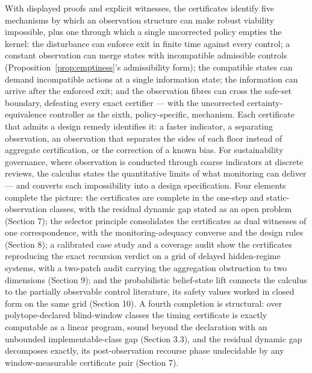 \documentclass[10pt,twocolumn]{article}
\theoremstyle{definition}
\begin{document}
With displayed proofs and explicit witnesses, the certificates identify
five mechanisms by which an observation structure can make robust
viability impossible, plus one through which a single uncorrected policy
empties the kernel: the disturbance can enforce exit in finite time
against every control; a constant observation can merge states with
incompatible admissible controls (Proposition~\ref{prop:emptiness}'s admissibility form);
the compatible states can demand incompatible actions at a single
information state; the information can arrive after the enforced exit;
and the observation fibres can cross the safe-set boundary, defeating
every exact certifier --- with the uncorrected certainty-equivalence controller as the
sixth, policy-specific, mechanism. Each certificate that admits a design
remedy identifies it: a faster indicator, a separating observation, an
observation that separates the sides of each floor instead of aggregate
certification, or the correction of a known bias. For sustainability
governance, where observation is conducted through coarse indicators at
discrete reviews, the calculus states the quantitative limits of what
monitoring can deliver --- and converts each impossibility into a design
specification. Four elements complete the picture: the certificates are complete in the one-step and static-observation classes, with the residual dynamic gap stated as an open problem (Section 7); the selector principle consolidates the certificates as dual witnesses of one correspondence, with the monitoring-adequacy converse and the design rules (Section 8); a calibrated case study and a coverage audit show the certificates reproducing the exact recursion verdict on a grid of delayed hidden-regime systems, with a two-patch audit carrying the aggregation obstruction to two dimensions (Section 9); and the probabilistic belief-state lift connects the calculus to the partially observable control literature, its safety values worked in closed form on the same grid (Section 10). A fourth completion is structural: over polytope-declared
blind-window classes the timing certificate is exactly computable as a linear
program, sound beyond the declaration with an unbounded implementable-class gap
(Section 3.3), and the residual dynamic gap decomposes exactly, its
post-observation recourse phase undecidable by any window-measurable certificate
pair (Section 7).
\end{document}
